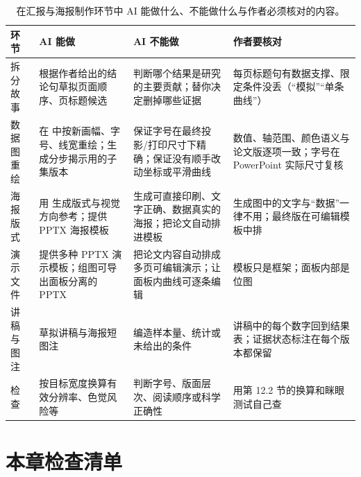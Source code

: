 \begin{table}[htbp]\centering\footnotesize
\setlength{\tabcolsep}{3pt}
\renewcommand{\arraystretch}{1.15}
\caption{在汇报与海报制作环节中 AI 能做什么、不能做什么与作者必须核对的内容。}\label{tab:ch12-01}
\begin{tabularx}{\linewidth}{@{}>{\raggedright\arraybackslash}p{18mm}YYY@{}}
\toprule
\textbf{环节} & \textbf{AI 能做} & \textbf{AI 不能做} & \textbf{作者要核对} \\
\midrule
拆分故事 & 根据作者给出的结论句草拟页面顺序、页标题候选 & 判断哪个结果是研究的主要贡献；替你决定删掉哪些证据 & 每页标题句有数据支撑、限定条件没丢（“模拟”“单条曲线”） \\
数据图重绘 & 在  中按新画幅、字号、线宽重绘；生成分步揭示用的子集版本 & 保证字号在最终投影/打印尺寸下精确；保证没有顺手改动坐标或平滑曲线 & 数值、轴范围、颜色语义与论文版逐项一致；字号在 PowerPoint 实际尺寸复核 \\
海报版式 & 用  生成版式与视觉方向参考；提供 PPTX 海报模板 & 生成可直接印刷、文字正确、数据真实的海报；把论文自动排进模板 & 生成图中的文字与“数据”一律不用；最终版在可编辑模板中排 \\
演示文件 & 提供多种 PPTX 演示模板；组图可导出面板分离的 PPTX & 把论文内容自动排成多页可编辑演示；让面板内曲线可逐条编辑 & 模板只是框架；面板内部是位图 \\
讲稿与图注 & 草拟讲稿与海报短图注 & 编造样本量、统计或未给出的条件 & 讲稿中的每个数字回到结果表；证据状态标注在每个版本都保留 \\
检查 &  按目标宽度换算有效分辨率、色觉风险等 & 判断字号、版面层次、阅读顺序或科学正确性 & 用第 12.2 节的换算和眯眼测试自己查 \\
\bottomrule
\end{tabularx}
\end{table}

\section{本章检查清单}

